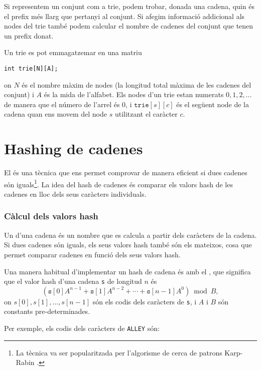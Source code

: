 Si representem un conjunt com a trie, podem trobar, donada una cadena,
quin és el prefix més llarg que pertanyi al conjunt. Si afegim
informació addicional als nodes del trie també podem calcular el
nombre de cadenes del conjunt que tenen un prefix donat.

Un trie es pot emmagatzemar en una matriu
\begin{lstlisting}
int trie[N][A];
\end{lstlisting}
on $N$ és el nombre màxim de nodes (la longitud total màxima de les
cadenes del conjunt) i $A$ és la mida de l'alfabet. Els nodes d'un
trie estan numerats $0,1,2,\ldots$ de manera que el número de l'arrel
és 0, i $\texttt{trie}[s][c]$ és el següent node de la cadena quan ens
movem del node $s$ utilitzant el caràcter $c$.

\section{Hashing de cadenes}

 

El  és una tècnica que ens permet comprovar de manera
eficient si dues cadenes són iguals\footnote{La tècnica va ser
popularitzada per l'algorisme de cerca de patrons Karp-Rabin
\cite{kar87}.}. La idea del hash de cadenes és comparar els valors
hash de les cadenes en lloc dels seus caràcters individuals.

\subsubsection*{Càlcul dels valors hash}

 

Un  d'una cadena és un nombre que es calcula a
partir dels caràcters de la cadena. Si dues cadenes són iguals, els
seus valors hash també són els mateixos, cosa que permet comparar
cadenes en funció dels seus valors hash.

Una manera habitual d'implementar un hash de cadena és amb el
, que significa que el valor hash d'una cadena
\texttt{s} de longitud $n$ és
\[(\texttt{s}[0] A^{n-1} + \texttt{s}[1] A^{n-2} + \cdots + \texttt{s}[n-1] A^0) \bmod B  ,\]
on $s[0],s[1],\ldots,s[n-1]$ són els codis dels
caràcters de \texttt{s}, i $A$ i $B$ són constants pre-determinades.

Per exemple, els codis dels caràcters de \texttt{ALLEY} són:
\begin{center}
\end{center}


